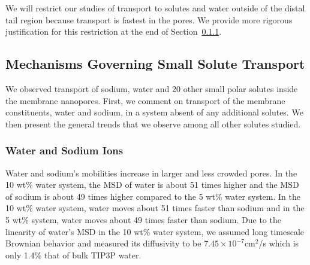 \documentclass[journal=jpcbfk,manuscript=article]{achemso}
\begin{document}
  We will restrict our studies of transport to solutes and water outside of the 
  distal tail region because transport is fastest in the pores. We provide more 
  rigorous justification for this restriction at the end of Section~\ref{section:transport_water_sodium}.

  \subsection{Mechanisms Governing Small Solute Transport}\label{section:mechanism_overview} 

  We observed transport of sodium, water and 20 other small polar solutes
  inside the membrane nanopores. First, we comment on transport of the
  membrane constituents, water and sodium, in a system absent of any additional
  solutes. We then present the general trends that we observe among 
  all other solutes studied.
  
  \subsubsection{Water and Sodium Ions}\label{section:transport_water_sodium} 

  Water and sodium's mobilities increase in larger and less crowded pores. 
  In the 10 wt\% water system, the MSD of water is about 51 times higher and
  the MSD of sodium is about 49 times higher compared to the 5 wt\% water system. 
  In the 10 wt\% water system, water moves about 51 times faster than sodium 
  and in the 5 wt\% system, water moves about 49 times faster than sodium. Due to
  the linearity of water's MSD in the 10 wt\% water system, we assumed
  long timescale Brownian behavior and measured its diffusivity to be 
  $7.45 \times 10^{-7}$cm$^2$/s which is only 1.4\% that of bulk TIP3P 
  water.~\cite{mahoney_diffusion_2000} %
  
\end{document}
